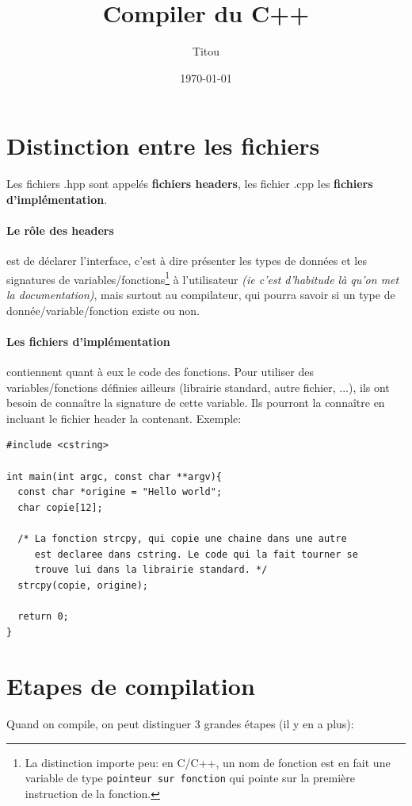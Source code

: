 \documentclass[a4paper]{article}
\author{Titou}
\date{\today}
\title{Compiler du C++}
\begin{document}
\maketitle

\section{Distinction entre les fichiers}
Les fichiers .hpp sont appelés \textbf{fichiers headers}, les fichier .cpp les \textbf{fichiers d'implémentation}. 

\paragraph{Le rôle des headers} est de déclarer l'interface, c'est à dire présenter les types de données et les signatures de variables/fonctions\footnote{La distinction importe peu: en C/C++, un nom de fonction est en fait une variable de type \texttt{pointeur sur fonction} qui pointe sur la première instruction de la fonction.} à l'utilisateur \textit{(ie c'est d'habitude là qu'on met la documentation)}, mais surtout au compilateur, qui pourra savoir si un type de donnée/variable/fonction existe ou non.

\paragraph{Les fichiers d'implémentation} contiennent quant à eux le code des fonctions. Pour utiliser des variables/fonctions définies ailleurs (librairie standard, autre fichier, ...), ils ont besoin de connaître la signature de cette variable. Ils pourront la connaître en incluant le fichier header la contenant. Exemple:
\begin{lstlisting}
#include <cstring>

int main(int argc, const char **argv){
  const char *origine = "Hello world";
  char copie[12];
  
  /* La fonction strcpy, qui copie une chaine dans une autre
     est declaree dans cstring. Le code qui la fait tourner se
     trouve lui dans la librairie standard. */
  strcpy(copie, origine);
  
  return 0;
}
\end{lstlisting}

\section{Etapes de compilation}
Quand on compile, on peut distinguer 3 grandes étapes (il y en a plus):
\end{document}

